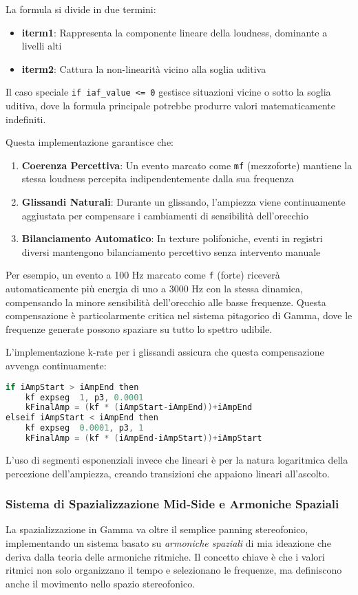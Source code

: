 La formula si divide in due termini:
\begin{itemize}
 \item \textbf{iterm1}: Rappresenta la componente lineare della loudness, dominante a livelli alti
 \item \textbf{iterm2}: Cattura la non-linearità vicino alla soglia uditiva
\end{itemize}

Il caso speciale \texttt{if iaf\_value <= 0} gestisce situazioni vicine o sotto la soglia uditiva, dove la formula principale potrebbe produrre valori matematicamente indefiniti.

Questa implementazione garantisce che:

\begin{enumerate}
    \item \textbf{Coerenza Percettiva}: Un evento marcato come \texttt{mf} (mezzoforte) mantiene la stessa loudness percepita indipendentemente dalla sua frequenza
    \item \textbf{Glissandi Naturali}: Durante un glissando, l'ampiezza viene continuamente aggiustata per compensare i cambiamenti di sensibilità dell'orecchio
    \item \textbf{Bilanciamento Automatico}: In texture polifoniche, eventi in registri diversi mantengono bilanciamento percettivo senza intervento manuale
\end{enumerate}
Per esempio, un evento a 100 Hz marcato come \texttt{f} (forte) riceverà automaticamente più energia di uno a 3000 Hz con la stessa dinamica, compensando la minore sensibilità dell'orecchio alle basse frequenze. Questa compensazione è particolarmente critica nel sistema pitagorico di Gamma, dove le frequenze generate possono spaziare su tutto lo spettro udibile.

L'implementazione k-rate per i glissandi assicura che questa compensazione avvenga continuamente:

\begin{lstlisting}[language=C]
if iAmpStart > iAmpEnd then
    kf expseg  1, p3, 0.0001
    kFinalAmp = (kf * (iAmpStart-iAmpEnd))+iAmpEnd
elseif iAmpStart < iAmpEnd then
    kf expseg  0.0001, p3, 1
    kFinalAmp = (kf * (iAmpEnd-iAmpStart))+iAmpStart
\end{lstlisting}

L'uso di segmenti esponenziali invece che lineari è per la natura logaritmica della percezione dell'ampiezza, creando transizioni che appaiono lineari all'ascolto.
\subsubsection{Sistema di Spazializzazione Mid-Side e Armoniche Spaziali}
La spazializzazione in Gamma va oltre il semplice panning stereofonico, implementando un sistema basato su \textit{armoniche spaziali} di mia ideazione che deriva dalla teoria delle armoniche ritmiche. Il concetto chiave è che i valori ritmici non solo organizzano il tempo e selezionano le frequenze, ma definiscono anche il movimento nello spazio stereofonico.

